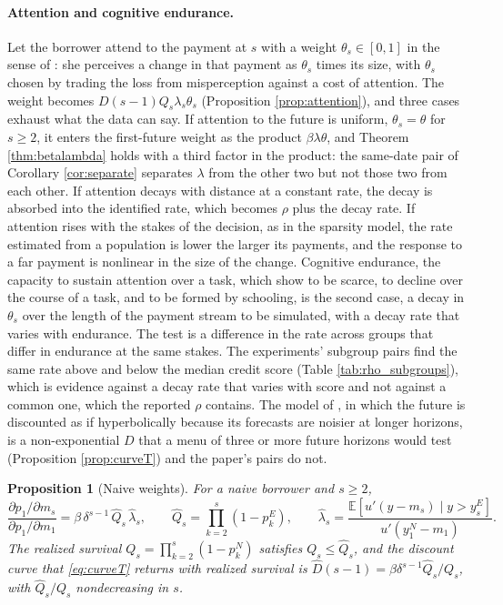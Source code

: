 \documentclass[12pt,english]{article}
\newtheorem{proposition}[theorem]{Proposition}
\begin{document}
\paragraph{Attention and cognitive endurance.} Let the borrower attend to the payment at $s$ with a weight $\theta_s \in [0,1]$ in the sense of \citet{gabaix_sparsity_2014}: she perceives a change in that payment as $\theta_s$ times its size, with $\theta_s$ chosen by trading the loss from misperception against a cost of attention. The weight becomes $D(s-1)Q_s\lambda_s\theta_s$ (Proposition \ref{prop:attention}), and three cases exhaust what the data can say. If attention to the future is uniform, $\theta_s = \theta$ for $s \ge 2$, it enters the first-future weight as the product $\beta\lambda\theta$, and Theorem \ref{thm:betalambda} holds with a third factor in the product: the same-date pair of Corollary \ref{cor:separate} separates $\lambda$ from the other two but not those two from each other. If attention decays with distance at a constant rate, the decay is absorbed into the identified rate, which becomes $\rho$ plus the decay rate. If attention rises with the stakes of the decision, as in the sparsity model, the rate estimated from a population is lower the larger its payments, and the response to a far payment is nonlinear in the size of the change. Cognitive endurance, the capacity to sustain attention over a task, which \citet{brown_cognitive_2025} show to be scarce, to decline over the course of a task, and to be formed by schooling, is the second case, a decay in $\theta_s$ over the length of the payment stream to be simulated, with a decay rate that varies with endurance. The test is a difference in the rate across groups that differ in endurance at the same stakes. The experiments' subgroup pairs find the same rate above and below the median credit score (Table \ref{tab:rho_subgroups}), which is evidence against a decay rate that varies with score and not against a common one, which the reported $\rho$ contains. The model of \citet{gabaix_myopia_2022}, in which the future is discounted as if hyperbolically because its forecasts are noisier at longer horizons, is a non-exponential $D$ that a menu of three or more future horizons would test (Proposition \ref{prop:curveT}) and the paper's pairs do not.

\begin{proposition}[Naive weights]\label{prop:naiveT}
For a naive borrower and $s \ge 2$,
\[
\frac{\partial p_1/\partial m_s}{\partial p_1/\partial m_1} = \beta\,\delta^{s-1}\,\hat Q_s\,\hat\lambda_s, \qquad \hat Q_s = \prod_{k=2}^{s}(1 - p^E_k), \qquad \hat\lambda_s = \frac{\mathbb{E}[u'(y - m_s) \mid y > y^E_s]}{u'(y^N_1 - m_1)} .
\]
The realized survival $Q_s = \prod_{k=2}^{s}(1 - p^N_k)$ satisfies $Q_s \le \hat Q_s$, and the discount curve that \eqref{eq:curveT} returns with realized survival is $\hat D(s-1) = \beta\delta^{s-1}\hat Q_s/Q_s$, with $\hat Q_s/Q_s$ nondecreasing in $s$.
\end{proposition}
\end{document}
